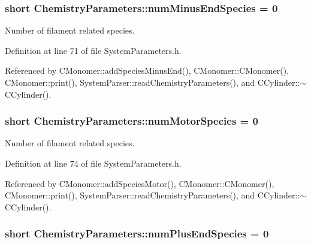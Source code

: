 \hypertarget{structChemistryParameters_a13d911b0639656b466b1ea13be22be00}{
\subsubsection[{num\+Minus\+End\+Species}]{\setlength{\rightskip}{0pt plus 5cm}short Chemistry\+Parameters\+::num\+Minus\+End\+Species = 0}}\label{structChemistryParameters_a13d911b0639656b466b1ea13be22be00}


Number of filament related species. 



Definition at line 71 of file System\+Parameters.\+h.



Referenced by C\+Monomer\+::add\+Species\+Minus\+End(), C\+Monomer\+::\+C\+Monomer(), C\+Monomer\+::print(), System\+Parser\+::read\+Chemistry\+Parameters(), and C\+Cylinder\+::$\sim$\+C\+Cylinder().

\hypertarget{structChemistryParameters_a6aecadee2f3bb6bc436395473447c485}{
\subsubsection[{num\+Motor\+Species}]{\setlength{\rightskip}{0pt plus 5cm}short Chemistry\+Parameters\+::num\+Motor\+Species = 0}}\label{structChemistryParameters_a6aecadee2f3bb6bc436395473447c485}


Number of filament related species. 



Definition at line 74 of file System\+Parameters.\+h.



Referenced by C\+Monomer\+::add\+Species\+Motor(), C\+Monomer\+::\+C\+Monomer(), C\+Monomer\+::print(), System\+Parser\+::read\+Chemistry\+Parameters(), and C\+Cylinder\+::$\sim$\+C\+Cylinder().

\hypertarget{structChemistryParameters_a14a3adb276b758bb6f2e5d0a27f80b15}{
\subsubsection[{num\+Plus\+End\+Species}]{\setlength{\rightskip}{0pt plus 5cm}short Chemistry\+Parameters\+::num\+Plus\+End\+Species = 0}}\label{structChemistryParameters_a14a3adb276b758bb6f2e5d0a27f80b15}


